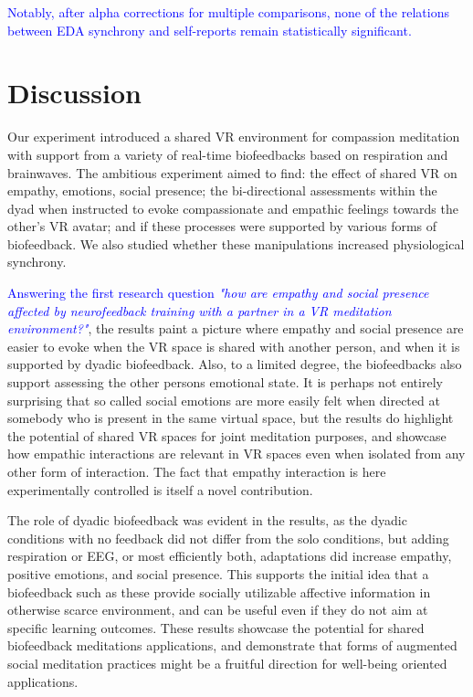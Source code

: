 \documentclass[manuscript, review = false, screen]{acmart}
\begin{document}
\textcolor{blue}{Notably, after alpha corrections for multiple comparisons, none of the relations between EDA synchrony and self-reports remain statistically significant.}



\section{Discussion}

Our experiment introduced a shared VR environment for compassion meditation with support from a variety of real-time biofeedbacks based on respiration and brainwaves. The ambitious experiment aimed to find: the effect of shared VR on empathy, emotions, social presence; the bi-directional assessments within the dyad when instructed to evoke compassionate and empathic feelings towards the other's VR avatar; and if these processes were supported by various forms of biofeedback. We also studied whether these manipulations increased physiological synchrony.

\textcolor{blue}{Answering the first research question \textit{"how are empathy and social presence affected by neurofeedback training with a partner in a VR meditation environment?"}}, the results paint a picture where empathy and social presence are easier to evoke when the VR space is shared with another person, and when it is supported by dyadic biofeedback. Also, to a limited degree, the biofeedbacks also support assessing the other persons emotional state. It is perhaps not entirely surprising that so called social emotions are more easily felt when directed at somebody who is present in the same virtual space, but the results do highlight the potential of shared VR spaces for joint meditation purposes, and showcase how empathic interactions are relevant in VR spaces even when isolated from any other form of interaction. The fact that empathy interaction is here experimentally controlled is itself a novel contribution.

The role of dyadic biofeedback was evident in the results, as the dyadic conditions with no feedback did not differ from the solo conditions, but adding respiration or EEG, or most efficiently both, adaptations did increase empathy, positive emotions, and social presence. This supports the initial idea that a biofeedback such as these provide socially utilizable affective information in otherwise scarce environment, and can be useful even if they do not aim at specific learning outcomes. These results showcase the potential for shared biofeedback meditations applications, and demonstrate that forms of augmented social meditation practices might be a fruitful direction for well-being oriented applications.
\end{document}
